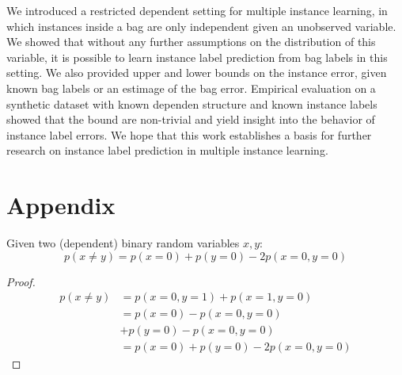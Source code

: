 We introduced a restricted dependent setting for multiple instance learning, in which instances inside a bag
are only independent given an unobserved variable. We showed that without any further assumptions
on the distribution of this variable, it is possible to learn instance label prediction from bag labels
in this setting. We also provided upper and lower bounds on the instance error, given known bag labels
or an estimage of the bag error.
Empirical evaluation on a synthetic dataset with known dependen structure and known instance labels
showed that the bound are non-trivial and yield insight into the behavior of instance label errors.
We hope that this work establishes a basis for further research on instance label prediction
in multiple instance learning.
  

\section{Appendix}
\begin{lemma}\label{binarylemma}
Given two (dependent) binary random variables $x,y$:
\begin{equation}
p(x \neq y) = p(x=0) + p(y=0) - 2 p(x=0, y=0)
\end{equation}

\begin{proof}
\begin{align}
p(x \neq y) & = p(x=0, y=1) + p(x=1, y=0) \\
                &= p(x=0) - p(x=0, y=0)\\
                &  + p(y=0) - p(x=0, y=0) \\
                &= p(x=0) + p(y=0) -2 p(x=0, y=0)
\end{align}
\end{proof}
\end{lemma}

